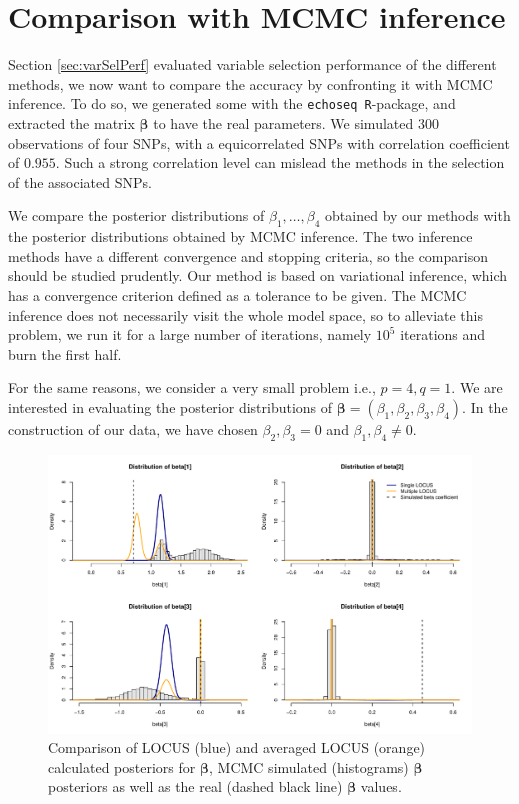 \documentclass[a4paper, 11pt]{report}
\numberwithin{equation}{chapter}
\begin{document}
\section{Comparison with MCMC inference}
Section \ref{sec:varSelPerf} evaluated variable selection performance of the different methods, we now want to compare the accuracy by confronting it with MCMC inference. To do so, we generated some with the \texttt{echoseq R}-package, and extracted the matrix $\boldsymbol{\beta}$ to have the real parameters. We simulated $300$ observations of four SNPs, with a equicorrelated SNPs with correlation coefficient of $0.955$. Such a strong correlation level can mislead the methods in the selection of the associated SNPs.

We compare the posterior distributions of $\beta_1,\dots,\beta_4$ obtained by our methods with the posterior distributions obtained by MCMC inference. The two inference methods have a different convergence and stopping criteria, so the comparison should be studied prudently. Our method is based on variational inference, which has a convergence criterion defined as a tolerance to be given. The MCMC inference does not necessarily visit the whole model space, so to alleviate this problem, we run it for a large number of iterations, namely $10^5$ iterations and burn the first half.

For the same reasons, we consider a very small problem i.e., $p=4, q=1$. We are interested in evaluating the posterior distributions of $\boldsymbol{\beta} = (\beta_1, \beta_2, \beta_3, \beta_4)$. In the construction of our data, we have chosen $\beta_2, \beta_3 = 0$ and $\beta_1, \beta_4 \neq 0$.
\begin{figure}[h]
\includegraphics[width=\textwidth, bb=0 0 800px 600px]{images/no_annealing.pdf}
\caption{\label{fig:no_ann}Comparison of LOCUS (blue) and averaged LOCUS (orange) calculated posteriors for $\boldsymbol{\beta}$, MCMC simulated (histograms) $\boldsymbol{\beta}$ posteriors as well as the real (dashed black line) $\boldsymbol{\beta}$ values.}
\end{figure}
\end{document}
